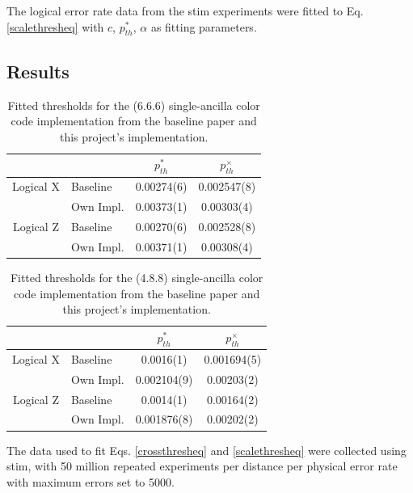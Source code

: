 The logical error rate data from the stim experiments were fitted to Eq. \ref{scalethresheq} with $c$, $p^*_{th}$, $\alpha$ as fitting parameters. 

\subsection{Results}

\begin{table}[htpb]
\label{tab:cc_thresholds_666}
\centering
\begin{tabular}{cl|cc}
\hline
 &          & $p^*_{th}$         & $p^\times_{th}$         \\ \hline
Logical X & Baseline & 0.00274(6)  & 0.002547(8) \\
    & Own Impl.     & 0.00373(1)  & 0.00303(4)  \\ \hline
 Logical Z & Baseline & 0.00270(6)  & 0.002528(8) \\
    & Own Impl.     & 0.00371(1)  & 0.00308(4)  \\ \hline
\end{tabular}
\caption{Fitted thresholds for the (6.6.6) single-ancilla color code implementation from the baseline paper \cite{flaggedweightcolorcode} and this project's implementation.}
\end{table}

\begin{table}[htpb]
\label{tab:cc_thresholds_488}
\centering
\begin{tabular}{cl|cc}
\hline
    &          & $p^*_{th}$          & $p^\times_{th}$          \\ \hline
 Logical X & Baseline & 0.0016(1)   & 0.001694(5) \\
    & Own Impl.     & 0.002104(9) & 0.00203(2)  \\ \hline
 Logical Z & Baseline & 0.0014(1)   & 0.00164(2)  \\
    & Own Impl.     & 0.001876(8) & 0.00202(2)  \\ \hline
\end{tabular}
\caption{Fitted thresholds for the (4.8.8) single-ancilla color code implementation from the baseline paper \cite{flaggedweightcolorcode} and this project's implementation.}
\end{table}


    
The data used to fit Eqs. \ref{crossthresheq} and \ref{scalethresheq} were collected using stim, with 50 million repeated experiments per distance per physical error rate with maximum errors set to 5000.

